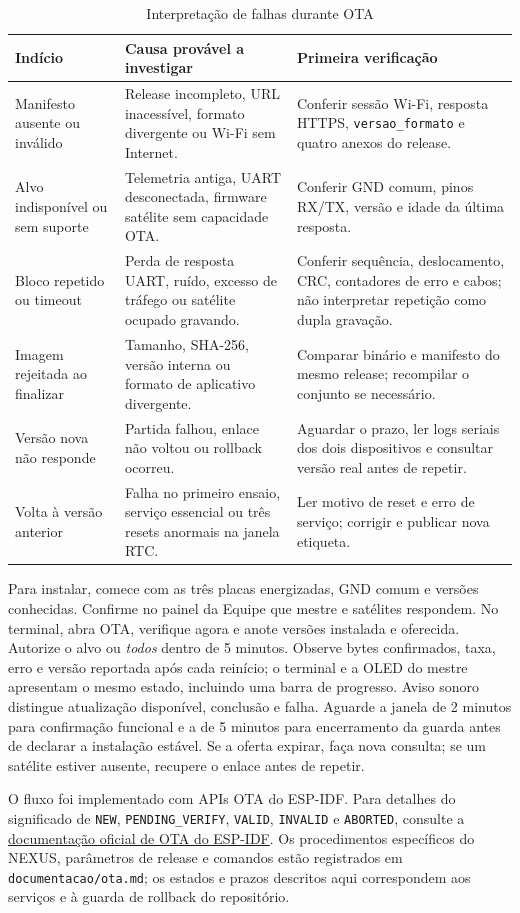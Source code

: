 \begin{table}[htbp]\centering\small
\caption{Interpretação de falhas durante OTA}\label{tab:falhas-ota}
\begin{tabularx}{\textwidth}{@{}l X X@{}}\toprule
Indício & Causa provável a investigar & Primeira verificação\\\midrule
Manifesto ausente ou inválido & Release incompleto, URL inacessível, formato divergente ou Wi-Fi sem Internet. & Conferir sessão Wi-Fi, resposta HTTPS, \texttt{versao\_formato} e quatro anexos do release.\\
Alvo indisponível ou sem suporte & Telemetria antiga, UART desconectada, firmware satélite sem capacidade OTA. & Conferir GND comum, pinos RX/TX, versão e idade da última resposta.\\
Bloco repetido ou timeout & Perda de resposta UART, ruído, excesso de tráfego ou satélite ocupado gravando. & Conferir sequência, deslocamento, CRC, contadores de erro e cabos; não interpretar repetição como dupla gravação.\\
Imagem rejeitada ao finalizar & Tamanho, SHA-256, versão interna ou formato de aplicativo divergente. & Comparar binário e manifesto do mesmo release; recompilar o conjunto se necessário.\\
Versão nova não responde & Partida falhou, enlace não voltou ou rollback ocorreu. & Aguardar o prazo, ler logs seriais dos dois dispositivos e consultar versão real antes de repetir.\\
Volta à versão anterior & Falha no primeiro ensaio, serviço essencial ou três resets anormais na janela RTC. & Ler motivo de reset e erro de serviço; corrigir e publicar nova etiqueta.\\\bottomrule
\end{tabularx}\end{table}

Para instalar, comece com as três placas energizadas, GND comum e versões conhecidas. Confirme no painel da Equipe que mestre e satélites respondem. No terminal, abra OTA, verifique agora e anote versões instalada e oferecida. Autorize o alvo ou \emph{todos} dentro de 5 minutos. Observe bytes confirmados, taxa, erro e versão reportada após cada reinício; o terminal e a OLED do mestre apresentam o mesmo estado, incluindo uma barra de progresso. Aviso sonoro distingue atualização disponível, conclusão e falha. Aguarde a janela de 2 minutos para confirmação funcional e a de 5 minutos para encerramento da guarda antes de declarar a instalação estável. Se a oferta expirar, faça nova consulta; se um satélite estiver ausente, recupere o enlace antes de repetir.

O fluxo foi implementado com APIs OTA do ESP-IDF. Para detalhes do significado de \texttt{NEW}, \texttt{PENDING\_VERIFY}, \texttt{VALID}, \texttt{INVALID} e \texttt{ABORTED}, consulte a \href{https://docs.espressif.com/projects/esp-idf/en/latest/esp32s3/api-reference/system/ota.html}{documentação oficial de OTA do ESP-IDF}. Os procedimentos específicos do NEXUS, parâmetros de release e comandos estão registrados em \texttt{documentacao/ota.md}; os estados e prazos descritos aqui correspondem aos serviços e à guarda de rollback do repositório.
